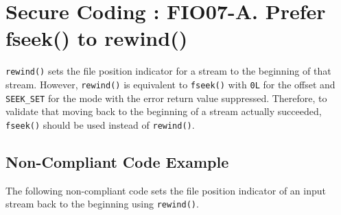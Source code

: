 
   \section{Secure Coding : FIO07-A. Prefer fseek() to rewind()}

   {\tt rewind()} sets the file position indicator for a stream to the beginning of that stream. However, {\tt rewind()} is equivalent to {\tt fseek()} with {\tt 0L} for the offset and {\tt SEEK\_SET} for the mode with the error return value suppressed. Therefore, to validate that moving back to the beginning of a stream actually succeeded, {\tt fseek()} should be used instead of {\tt rewind()}.
   \subsection{Non-Compliant Code Example}

   The following non-compliant code sets the file position indicator of an input stream back to the beginning using {\tt rewind()}.


